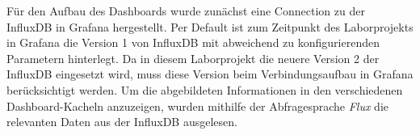Für den Aufbau des Dashboards wurde zunächst eine Connection zu der InfluxDB in Grafana hergestellt. Per Default ist zum Zeitpunkt des Laborprojekts in Grafana die Version 1 von InfluxDB mit abweichend zu konfigurierenden Parametern hinterlegt. Da in diesem Laborprojekt die neuere Version 2 der InfluxDB eingesetzt wird, muss diese Version beim Verbindungsaufbau in Grafana berücksichtigt werden.
Um die abgebildeten Informationen in den verschiedenen Dashboard-Kacheln anzuzeigen, wurden mithilfe der Abfragesprache \textit{Flux} die relevanten Daten aus der InfluxDB ausgelesen.



